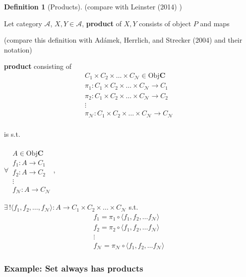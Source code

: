 \documentclass[twoside,landscape,10pt]{amsart}
\theoremstyle{plain}
\theoremstyle{definition}
\newtheorem{definition}{Definition}
\theoremstyle{remark}
\begin{document}
\begin{multicols*}{2}
\begin{definition}[Products]
(compare with Leinster (2014) \cite{Lein2014})

Let category $\mathcal{A}$, $X,Y \in \mathcal{A}$, \textbf{product} of $X,Y$ consists of object $P$ and maps

(compare this definition with Ad\'{a}mek, Herrlich, and Strecker (2004) \cite{AHS2004} and their notation)

\textbf{product} consisting of 
\[
\begin{aligned}
  C_1 \times C_2 \times \dots \times C_{\mathcal{N}} \in \text{Obj}\mathbf{C} \\
  \pi_1 : C_1 \times C_2 \times \dots \times C_{\mathcal{N}} \to C_1 \\ 
  \pi_2 : C_1 \times C_2 \times \dots \times C_{\mathcal{N}} \to C_2 \\ 
\vdots \\
  \pi_{\mathcal{N}} : C_1 \times C_2 \times \dots \times C_{\mathcal{N}} \to C_{\mathcal{N}} \\ 
\end{aligned}
\]

is s.t. 

$\forall \, \begin{aligned}  \quad \\ 
  A \in \text{Obj}\mathbf{C} \\
  f_1 : A \to C_1 \\
  f_2 : A \to C_2 \\
  \vdots \\
  f_{\mathcal{N}} : A \to C_{\mathcal{N}} \end{aligned}$, 

$\exists \, ! \langle f_1 ,f_2 , \dots , f_{\mathcal{N}} \rangle : A \to C_1 \times C_2 \times \dots \times C_{\mathcal{N}}$ s.t.
\[
\begin{aligned}
  f_1 = \pi_1 \circ \langle f_1 , f_2 , \dots f_{\mathcal{N}} \rangle \\ 
  f_2 = \pi_2 \circ \langle f_1 , f_2 , \dots f_{\mathcal{N}} \rangle \\ 
\vdots  \\ 
  f_{\mathcal{N}} = \pi_{\mathcal{N}} \circ \langle f_1 , f_2 , \dots f_{\mathcal{N}} \rangle 
\end{aligned}
\]

\end{definition}



\subsubsection{Example: Set always has products}


\end{multicols*}
\end{document}
